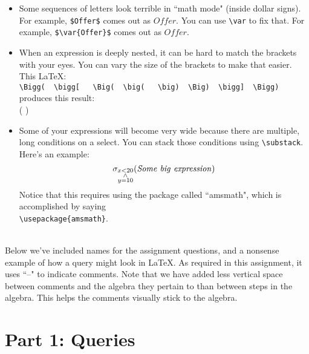 \documentclass{article}
\newcommand{\var}[1]{\mathit{#1}}
\begin{document}
\begin{itemize}
\item Some sequences of letters look terrible in ``math mode" (inside dollar signs).
For example, \verb|$Offer$| comes out as $Offer$.
You can use \verb|\var| to fix that.
For example, \verb|$\var{Offer}$| comes out as $\var{Offer}$.
\item When an expression is deeply nested, it can be hard to match the brackets with your eyes.
You can vary the size of the brackets to make that easier.
This LaTeX: \\[5pt]
\hspace*{1cm} \verb+\Bigg(  \bigg[   \Big(  \big(   \big)  \Big)  \bigg]  \Bigg)+ \\[5pt]
produces this result: \\[5pt]
\hspace*{1cm}  \Bigg( \bigg[ \Big( \big(  \big) \Big) \bigg] \Bigg)
\item 
Some of your expressions will become very wide because there are multiple, long
conditions on a select.
You can stack those conditions using \verb|\substack|.
Here's an example:
$$
\sigma_{\substack{x < 20 \\ \wedge \\ y = 10}} (\var{Some~big~expression}) \\[5pt]
$$
Notice that this requires using the package called ``amsmath", which is accomplished by saying\\
\verb|\usepackage{amsmath}|.
\end{itemize}

{~}\\
Below we've included names for the assignment questions, and 
a nonsense example of how a query might look in LaTeX.  
As required in this assignment, it uses ``--" to indicate comments.
Note that we have added less vertical space between comments
and the algebra they pertain to than between steps in the algebra.
This helps the comments visually stick to the algebra.



\section*{Part 1: Queries}
\end{document}
